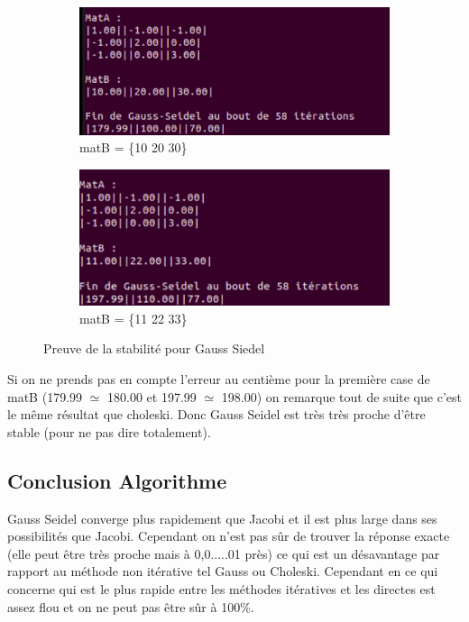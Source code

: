 \documentclass[12pt]{article}
\begin{document}
\begin{figure}[H]
  
  \begin{subfigure}{.5\textwidth}
    \center
    \includegraphics[width=1\linewidth]{./img/GSEcart1}
    \caption{matB = \{10 20 30\}}\label{Img_GSEcart1}
  \end{subfigure}%
  \begin{subfigure}{.5\textwidth}
    \center
    \includegraphics[width=1\linewidth]{img/GSEcart2}
    \caption{matB = \{11 22 33\}}\label{Img_GSEcart2}
  \end{subfigure}
\caption{Preuve de la stabilité pour Gauss Siedel}
\label{Fig_GSEcart}
\end{figure}

Si on ne prends pas en compte l'erreur au centième pour la première case de matB (179.99 $\simeq$ 180.00 et 197.99 $\simeq$ 198.00) on remarque tout de suite que c'est le même résultat que choleski. Donc Gauss Seidel est très très proche d'être stable (pour ne pas dire totalement).

\subsection{Conclusion Algorithme}

Gauss Seidel converge plus rapidement que Jacobi et il est plus large dans ses possibilités que Jacobi. Cependant on n’est pas sûr de trouver la réponse exacte (elle peut être très proche mais à 0,0.....01 près) ce qui est un désavantage par rapport au méthode non itérative tel Gauss ou Choleski. Cependant en ce qui concerne qui est le plus rapide entre les méthodes itératives et les directes est assez flou et on ne peut pas être sûr à 100\%.
\end{document}

